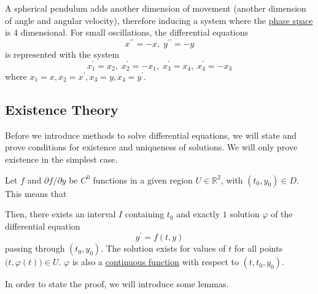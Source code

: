 \documentclass{article}
\newcounter{theorem}[section]
\newcounter{example}[section]
\begin{document}
      \begin{example}
        \label{ex:small-oscillations-of-spherical-pendulums}
      A spherical pendulum adds another dimension of movement (another dimension of angle and angular velocity), therefore inducing a system where the \hyperref[def:phase-space]{phase space} is 4 dimensional. For small oscillations, the differential equations
      \begin{equation}
        x^{\prime\prime} = -x, \; y^{\prime\prime} = - y
      \end{equation}
      is represented with the system
      \begin{equation}
        x_1^\prime = x_2, \; x_2^\prime = -x_1, \; x_3^\prime = x_4, \; x_4^\prime = - x_3
      \end{equation}
      where $x_1 = x, x_2 = x^\prime, x_3 = y, x_4 = y^\prime$. 
      \end{example}

  \subsection{Existence Theory}

    Before we introduce methods to solve differential equations, we will state and prove conditions for existence and uniqueness of solutions. We will only prove existence in the simplest case. 
    \begin{theorem}
      \label{thm:existence-of-solutions-in-a-first-order-system}
    Let $f$ and $\partial f / \partial y$ be $C^0$ functions in a given region $U \in \mathbb{R}^2$, with $(t_0, y_0) \in D$. This means that 

    Then, there exists an interval $I$ containing $t_0$ and exactly $1$ solution $\varphi$ of the differential equation 
    \begin{equation}
      y^\prime = f(t, y)
    \end{equation}
    passing through $(t_0, y_0)$. The solution exists for values of $t$ for all points $\big(t, \varphi(t)\big) \in U$. $\varphi$ is also a \hyperref[pst-def:continuous_func]{continuous function} with respect to $(t, t_0, y_0)$. 
    \end{theorem}
    In order to state the proof, we will introduce some lemmas. 
\end{document}
